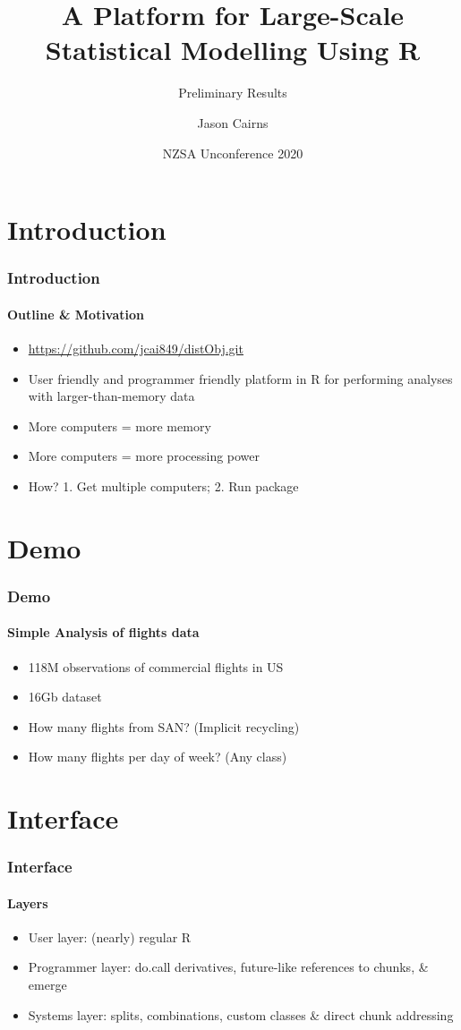 \documentclass[handout]{beamer}
\title{A Platform for Large-Scale Statistical Modelling Using R}
\subtitle{Preliminary Results}
\author{Jason Cairns}
\institute{University of Auckland}
\date{NZSA Unconference 2020}
\begin{document}
\frame{\titlepage}

\section{Introduction}
	\begin{frame}
		\frametitle{Introduction}
		\framesubtitle{Outline \& Motivation}
		\begin{itemize}
			\item \url{https://github.com/jcai849/distObj.git}
			\item User friendly and programmer friendly platform in R for performing analyses with larger-than-memory data
			\item More computers = more memory
			\item More computers = more processing power
			\item How? 1. Get multiple computers; 2. Run package
		\end{itemize}
	\end{frame}
\section{Demo}
	\begin{frame}
		\frametitle{Demo}
		\framesubtitle{Simple Analysis of flights data}
		\begin{itemize}
			\item 118M observations of commercial flights in US
			\item 16Gb dataset
			\item How many flights from SAN? (Implicit recycling)
			\item How many flights per day of week? (Any class)
		\end{itemize}
	\end{frame}
\section{Interface}
	\begin{frame}
		\frametitle{Interface}
		\framesubtitle{Layers}
		\begin{itemize}
			\item User layer: (nearly) regular R
			\item Programmer layer: do.call derivatives, future-like references to chunks, \& emerge
			\item Systems layer: splits, combinations, custom classes \& direct chunk addressing
		\end{itemize}
	\end{frame}
\end{document}
